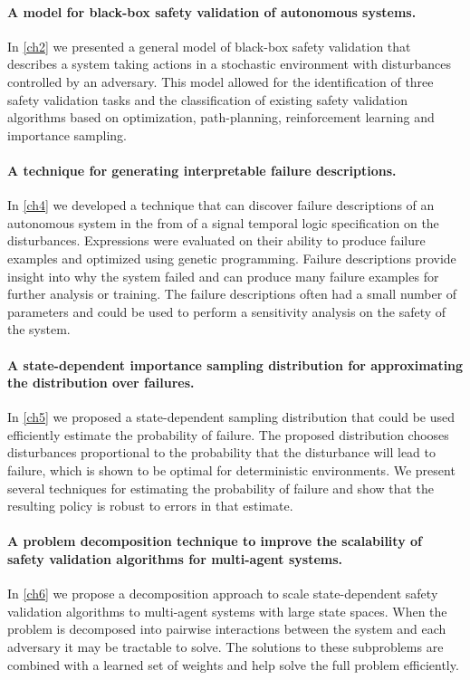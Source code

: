 \paragraph{A model for black-box safety validation of autonomous systems.} In \cref{ch2} we presented a general model of black-box safety validation that describes a system taking actions in a stochastic environment with disturbances controlled by an adversary. This model allowed for the identification of three safety validation tasks and the classification of existing safety validation algorithms based on optimization, path-planning, reinforcement learning and importance sampling. 

\paragraph{A technique for generating interpretable failure descriptions.} In \cref{ch4} we developed a technique that can discover failure descriptions of an autonomous system in the from of a signal temporal logic specification on the disturbances. Expressions were evaluated on their ability to produce failure examples and optimized using genetic programming. Failure descriptions provide insight into why the system failed and can produce many failure examples for further analysis or training. The failure descriptions often had a small number of parameters and could be used to perform a sensitivity analysis on the safety of the system. 

\paragraph{A state-dependent importance sampling distribution for approximating the distribution over failures.} In \cref{ch5} we proposed a state-dependent sampling distribution that could be used efficiently estimate the probability of failure. The proposed distribution chooses disturbances proportional to the probability that the disturbance will lead to failure, which is shown to be optimal for deterministic environments. We present several techniques for estimating the probability of failure and show that the resulting policy is robust to errors in that estimate. 

\paragraph{A problem decomposition technique to improve the scalability of safety validation algorithms for multi-agent systems.} In \cref{ch6} we propose a decomposition approach to scale state-dependent safety validation algorithms to multi-agent systems with large state spaces. When the problem is decomposed into pairwise interactions between the system and each adversary it may be tractable to solve. The solutions to these subproblems are combined with a learned set of weights and help solve the full problem efficiently. 

